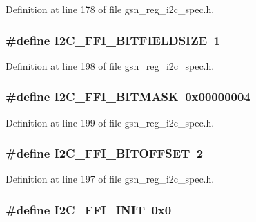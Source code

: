 Definition at line 178 of file gsn\_\-reg\_\-i2c\_\-spec.h.

\hypertarget{a00558_a215ce7e108aa687b63c4815c915b7e15}{
\subsubsection[{I2C\_\-FFI\_\-BITFIELDSIZE}]{\setlength{\rightskip}{0pt plus 5cm}\#define I2C\_\-FFI\_\-BITFIELDSIZE~1}}
\label{a00558_a215ce7e108aa687b63c4815c915b7e15}


Definition at line 198 of file gsn\_\-reg\_\-i2c\_\-spec.h.

\hypertarget{a00558_a54ef419f95a50c65ae4c453bf53c07d4}{
\subsubsection[{I2C\_\-FFI\_\-BITMASK}]{\setlength{\rightskip}{0pt plus 5cm}\#define I2C\_\-FFI\_\-BITMASK~0x00000004}}
\label{a00558_a54ef419f95a50c65ae4c453bf53c07d4}


Definition at line 199 of file gsn\_\-reg\_\-i2c\_\-spec.h.

\hypertarget{a00558_aa67256b0e79f47bda31688c7c59dc25c}{
\subsubsection[{I2C\_\-FFI\_\-BITOFFSET}]{\setlength{\rightskip}{0pt plus 5cm}\#define I2C\_\-FFI\_\-BITOFFSET~2}}
\label{a00558_aa67256b0e79f47bda31688c7c59dc25c}


Definition at line 197 of file gsn\_\-reg\_\-i2c\_\-spec.h.

\hypertarget{a00558_ad3b44ec095f515d4ac4ff798cca62457}{
\subsubsection[{I2C\_\-FFI\_\-INIT}]{\setlength{\rightskip}{0pt plus 5cm}\#define I2C\_\-FFI\_\-INIT~0x0}}
\label{a00558_ad3b44ec095f515d4ac4ff798cca62457}


